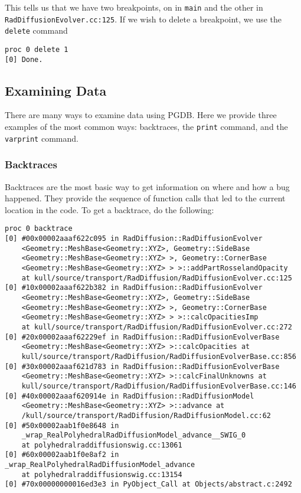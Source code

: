 \documentclass{refart}
\begin{document}
This tells us that we have two breakpoints, on in \texttt{main} and the other in \texttt{RadDiffusionEvolver.cc:125}. If we wish to delete a breakpoint, we use the \texttt{delete} command

\begin{Verbatim}
proc 0 delete 1
[0] Done.
\end{Verbatim}

\subsection{Examining Data}

There are many ways to examine data using PGDB. Here we provide three examples of the most common ways: backtraces, the \texttt{print} command, and the \texttt{varprint} command.

\subsubsection{Backtraces}

Backtraces are the most basic way to get information on where and how a bug happened. They provide the sequence of function calls that led to the current location in the code. To get a backtrace, do the following:

\begin{Verbatim}
proc 0 backtrace
[0] #00x00002aaaf622c095 in RadDiffusion::RadDiffusionEvolver
    <Geometry::MeshBase<Geometry::XYZ>, Geometry::SideBase
    <Geometry::MeshBase<Geometry::XYZ> >, Geometry::CornerBase
    <Geometry::MeshBase<Geometry::XYZ> > >::addPartRosselandOpacity
    at kull/source/transport/RadDiffusion/RadDiffusionEvolver.cc:125
[0] #10x00002aaaf622b382 in RadDiffusion::RadDiffusionEvolver
    <Geometry::MeshBase<Geometry::XYZ>, Geometry::SideBase
    <Geometry::MeshBase<Geometry::XYZ> >, Geometry::CornerBase
    <Geometry::MeshBase<Geometry::XYZ> > >::calcOpacitiesImp
    at kull/source/transport/RadDiffusion/RadDiffusionEvolver.cc:272
[0] #20x00002aaaf62229ef in RadDiffusion::RadDiffusionEvolverBase
    <Geometry::MeshBase<Geometry::XYZ> >::calcOpacities at
    kull/source/transport/RadDiffusion/RadDiffusionEvolverBase.cc:856
[0] #30x00002aaaf621d783 in RadDiffusion::RadDiffusionEvolverBase
    <Geometry::MeshBase<Geometry::XYZ> >::calcFinalUnknowns at
    kull/source/transport/RadDiffusion/RadDiffusionEvolverBase.cc:146
[0] #40x00002aaaf620914e in RadDiffusion::RadDiffusionModel
    <Geometry::MeshBase<Geometry::XYZ> >::advance at
    /kull/source/transport/RadDiffusion/RadDiffusionModel.cc:62
[0] #50x00002aab1f0e8648 in
    _wrap_RealPolyhedralRadDiffusionModel_advance__SWIG_0
    at polyhedralraddiffusionswig.cc:13061
[0] #60x00002aab1f0e8af2 in _wrap_RealPolyhedralRadDiffusionModel_advance
    at polyhedralraddiffusionswig.cc:13154
[0] #70x00000000016ed3e3 in PyObject_Call at Objects/abstract.c:2492
\end{Verbatim}
\end{document}

